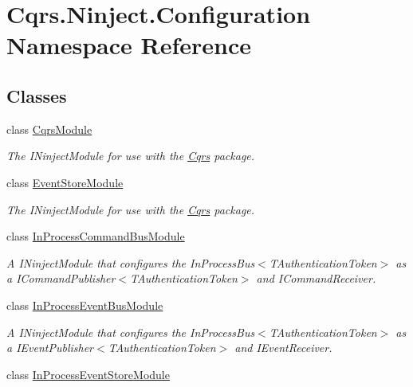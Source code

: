 \hypertarget{namespaceCqrs_1_1Ninject_1_1Configuration}{}\section{Cqrs.\+Ninject.\+Configuration Namespace Reference}
\label{namespaceCqrs_1_1Ninject_1_1Configuration}
\subsection*{Classes}
\begin{DoxyCompactItemize}
\item 
class \hyperlink{classCqrs_1_1Ninject_1_1Configuration_1_1CqrsModule}{Cqrs\+Module}
\begin{DoxyCompactList}\small\item\em The I\+Ninject\+Module for use with the \hyperlink{namespaceCqrs}{Cqrs} package. \end{DoxyCompactList}\item 
class \hyperlink{classCqrs_1_1Ninject_1_1Configuration_1_1EventStoreModule}{Event\+Store\+Module}
\begin{DoxyCompactList}\small\item\em The I\+Ninject\+Module for use with the \hyperlink{namespaceCqrs}{Cqrs} package. \end{DoxyCompactList}\item 
class \hyperlink{classCqrs_1_1Ninject_1_1Configuration_1_1InProcessCommandBusModule}{In\+Process\+Command\+Bus\+Module}
\begin{DoxyCompactList}\small\item\em A I\+Ninject\+Module that configures the In\+Process\+Bus$<$\+T\+Authentication\+Token$>$ as a I\+Command\+Publisher$<$\+T\+Authentication\+Token$>$ and I\+Command\+Receiver. \end{DoxyCompactList}\item 
class \hyperlink{classCqrs_1_1Ninject_1_1Configuration_1_1InProcessEventBusModule}{In\+Process\+Event\+Bus\+Module}
\begin{DoxyCompactList}\small\item\em A I\+Ninject\+Module that configures the In\+Process\+Bus$<$\+T\+Authentication\+Token$>$ as a I\+Event\+Publisher$<$\+T\+Authentication\+Token$>$ and I\+Event\+Receiver. \end{DoxyCompactList}\item 
class \hyperlink{classCqrs_1_1Ninject_1_1Configuration_1_1InProcessEventStoreModule}{In\+Process\+Event\+Store\+Module}

\end{DoxyCompactItemize}
